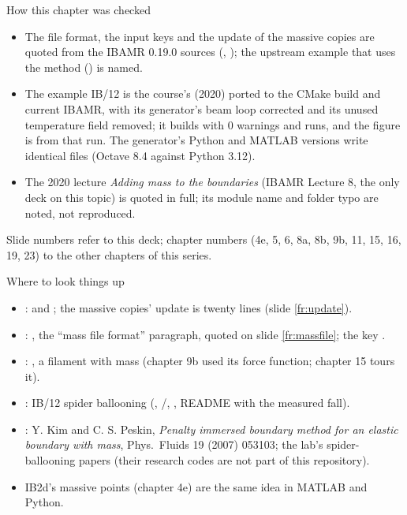 \documentclass[aspectratio=169,11pt]{beamer}
\begin{document}
\begin{frame}{How this chapter was checked}
\label{fr:checked}
\begin{itemize}\footnotesize
  \item The  file format, the  input keys and the update of the massive copies are quoted from the IBAMR 0.19.0 sources (, ); the upstream example that uses the method () is named.
  \item The example IB/12 is the course's  (2020) ported to the CMake build and current IBAMR, with its generator's beam loop corrected and its unused temperature field removed; it builds with 0 warnings and runs, and the figure is from that run. The generator's Python and MATLAB versions write identical files (Octave 8.4 against Python 3.12).
  \item The 2020 lecture \emph{Adding mass to the boundaries} (IBAMR Lecture 8, the only deck on this topic) is quoted in full; its module name and folder typo are noted, not reproduced.
\end{itemize}
\begin{punchbox}
\footnotesize Slide numbers refer to this deck; chapter numbers (4e, 5, 6, 8a, 8b, 9b, 11, 15, 16, 19, 23) to the other chapters of this series.
\end{punchbox}
\end{frame}

\begin{frame}{Where to look things up}
\label{fr:lookup}
\small
\begin{itemize}
  \item {}:  and ; the massive copies' update is twenty lines (slide \ref{fr:update}).
  \item {}: , the ``mass file format'' paragraph, quoted on slide \ref{fr:massfile}; the key .
  \item {}: , a filament with mass (chapter 9b used its force function; chapter 15 tours it).
  \item {}: IB/12 spider ballooning (, /, , README with the measured fall).
  \item {}: Y. Kim and C. S. Peskin, \emph{Penalty immersed boundary method for an elastic boundary with mass}, Phys.\ Fluids 19 (2007) 053103; the lab's spider-ballooning papers (their research codes are not part of this repository).
  \item IB2d's massive points (chapter 4e) are the same idea in MATLAB and Python.
\end{itemize}
\end{frame}
\end{document}
